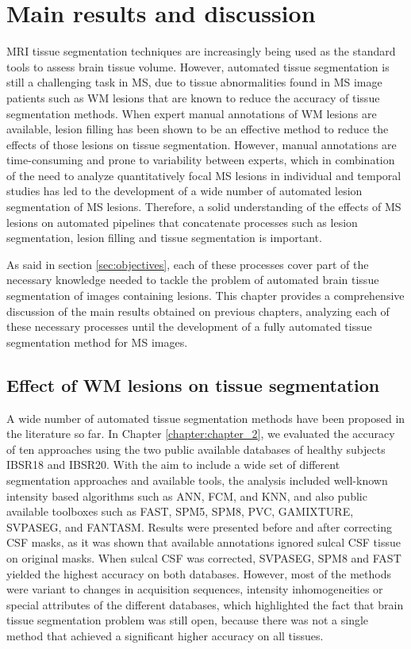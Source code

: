 \chapter{Main results and discussion}


MRI tissue segmentation techniques are increasingly being used as the standard tools to assess brain tissue volume. However, automated tissue segmentation is still a challenging task in MS, due to tissue abnormalities found in MS image patients such as WM lesions that are known to reduce the accuracy of tissue segmentation methods. When expert manual annotations of WM lesions are available, lesion filling has been shown to be an effective method to reduce the effects of those lesions on tissue segmentation. However, manual annotations are time-consuming and prone to variability between experts, which in combination of the need to analyze quantitatively focal MS lesions in individual and temporal studies has led to the development of a wide number of automated lesion segmentation of MS lesions. Therefore, a solid understanding of the effects of MS lesions on automated pipelines that concatenate processes such as lesion segmentation, lesion filling and tissue segmentation is important. 

As said in section \ref{sec:objectives}, each of these processes cover part of the necessary knowledge needed to tackle the problem of automated brain tissue segmentation of images containing lesions. This chapter provides a comprehensive discussion of the main results obtained on previous chapters, analyzing each of these necessary processes until the development of a fully automated tissue segmentation method for MS images.

\section{Effect of WM lesions on tissue segmentation}

A wide number of automated tissue segmentation methods have been proposed in the literature so far. In Chapter \ref{chapter:chapter_2}, we evaluated the accuracy of ten approaches using the two public available databases of healthy subjects IBSR18 and IBSR20. With the aim to include a wide set of different segmentation approaches and available tools, the analysis included well-known intensity based algorithms such as ANN, FCM, and KNN, and also public available toolboxes such as FAST, SPM5, SPM8, PVC, GAMIXTURE, SVPASEG, and FANTASM. Results were presented before and after correcting CSF masks, as it was shown that available annotations ignored sulcal CSF tissue on original masks. When sulcal CSF was corrected, SVPASEG, SPM8 and FAST yielded the highest accuracy on both databases.  However, most of the methods were variant to changes in acquisition sequences, intensity inhomogeneities or special attributes of the different databases,  which highlighted the fact that brain tissue segmentation problem was still open, because there was not a single method that achieved a significant higher accuracy on all tissues. 

